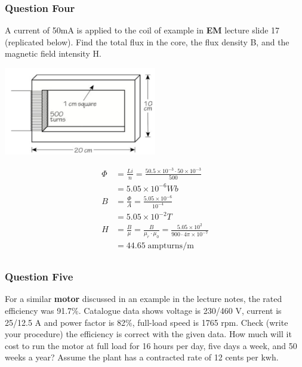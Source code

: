 \documentclass[a4paper,11pt]{article}
\begin{document}
\subsubsection*{Question Four}
A current of 50mA is applied to the coil of example in \textbf{EM} lecture slide 17 (replicated below). Find the total flux in the core, the flux density B, and the magnetic field intensity H.

\begin{center}
    \includegraphics[width=0.5\textwidth]{core.png}
\end{center}

\begin{align*}
    \Phi & = \frac{Li}{n} = \frac{50.5\times10^{-3} \cdot 50 \times 10^{-3}}{500}                           \\&= 5.05\times10^{-6}Wb\\
    B    & = \frac{\Phi}{A} = \frac{5.05\times10^{-6}}{10^{-4}}                                                   \\
         & = 5.05\times10^{-2}T                                                                              \\
    H    & = \frac{B}{\mu} = \frac{B}{\mu_r \cdot \mu_0} = \frac{5.05\times10^{2}}{900 \cdot 4\pi\times 10^{-7}} \\
         & = 44.65 \; \mathrm{ampturns/m}                                                    \\
\end{align*}

\subsubsection*{Question Five}
For a similar \textbf{motor} discussed in an example in the lecture notes, the rated efficiency was 91.7\%. Catalogue data shows voltage is 230/460 V, current is 25/12.5 A and power factor is 82\%, full-load speed is 1765 rpm. Check (write your procedure) the efficiency is correct with the given data. How much will it cost to run the motor at full load for 16 hours per day, five days a week, and 50 weeks a year? Assume the plant has a contracted rate of 12 cents per kwh.
\end{document}

